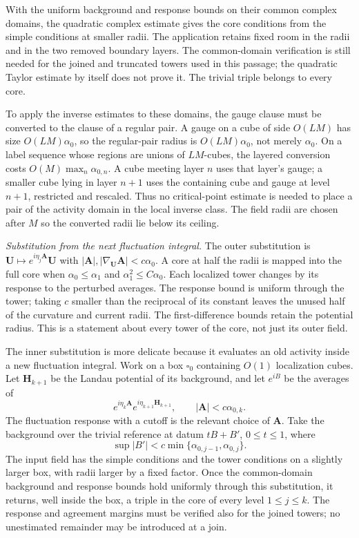\documentclass[11pt,letterpaper,reqno]{amsart}
\theoremstyle{definition}
\theoremstyle{remark}
\begin{document}
With the uniform background and response
bounds on their common complex domains,
the quadratic complex estimate gives the
core conditions from the simple conditions
at smaller radii. The application retains
fixed room in the radii and in the two
removed boundary layers. The common-domain
verification is still needed for the joined
and truncated towers used in this passage;
the quadratic Taylor estimate by itself
does not prove it. The trivial triple
belongs to every core.

To apply the inverse estimates to these
domains, the gauge clause must be converted
to the clause of a regular pair. A gauge
on a cube of side $O(LM)$ has size
$O(LM)\alpha_0$, so the regular-pair
radius is $O(LM)\alpha_0$, not merely
$\alpha_0$. On a label sequence whose
regions are unions of $LM$-cubes, the
layered conversion costs
$O(M)\max_n\alpha_{0,n}$. A cube meeting
layer $n$ uses that layer's gauge; a
smaller cube lying in layer $n+1$ uses
the containing cube and gauge at level
$n+1$, restricted and rescaled. Thus no
critical-point estimate is needed to
place a pair of the activity domain in
the local inverse class. The field
radii are chosen after $M$ so the
converted radii lie below its ceiling.

\emph{Substitution from the next fluctuation integral.}
The outer substitution is
$\mathbf U\mapsto e^{i\eta_j\mathbf A}\mathbf U$
with $|\mathbf A|,|\nabla_{\mathbf U}\mathbf A|
<c\alpha_0$. A core at half the radii is
mapped into the full core when
$\alpha_0\le\alpha_1$ and
$\alpha_1^2\le C\alpha_0$. Each localized tower
changes by its response to the perturbed
averages. The response bound is uniform
through the tower; taking $c$ smaller than
the reciprocal of its constant leaves
the unused half of the curvature and
current radii. The first-difference bounds
retain the potential radius. This is a
statement about every tower of the core,
not just its outer field.

The inner substitution is more delicate
because it evaluates an old activity
inside a new fluctuation integral. Work
on a box $\square_0$ containing $O(1)$
localization cubes. Let $\mathbf H_{k+1}$
be the Landau potential of its background,
and let $e^{iB}$ be the averages of
\[
 e^{i\eta_k\mathbf A}
                         e^{i\eta_{k+1}\mathbf H_{k+1}},
 \qquad |\mathbf A|<c\alpha_{0,k}.
\]
The fluctuation response with a cutoff
is the relevant choice of $\mathbf A$.
Take the background over the trivial
reference at datum $tB+B'$, $0\le t\le1$,
where
\[
 \sup|B'|<c\min\{\alpha_{0,j-1},\alpha_{0,j}\}.
\]
The input field has the simple conditions
and the tower conditions on a slightly
larger box, with radii larger by a fixed
factor. Once the common-domain background
and response bounds hold uniformly through
this substitution, it returns, well inside
the box, a triple in the core of every
level $1\le j\le k$. The response and
agreement margins must be verified also
for the joined towers; no unestimated
remainder may be introduced at a join.
\end{document}
